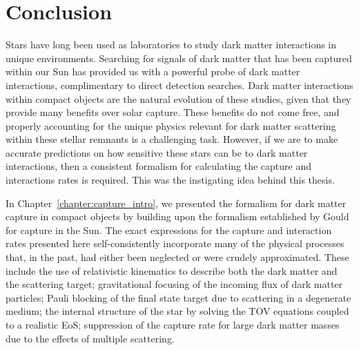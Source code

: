 
\chapter{Conclusion}
\label{chapter:conclusion}

  
Stars have long been used as laboratories to study dark matter interactions in unique environments. Searching for signals of dark matter that has been captured within our Sun has provided us with a powerful probe of dark matter interactions, complimentary to direct detection searches.
Dark matter interactions within compact objects are the natural evolution of these studies, given that they provide many benefits over solar capture. These benefits do not come free, and properly accounting for the unique physics relevant for dark matter scattering within these stellar remnants is a challenging task. However, if we are to make accurate predictions on how sensitive these stars can be to dark matter interactions, then a consistent formalism for calculating the capture and interactions rates is required. This was the instigating idea behind this thesis. 


In Chapter~\ref{chapter:capture_intro}, we presented the formalism for dark matter capture in compact objects by building upon the formalism established by Gould for capture in the Sun. The exact expressions for the capture and interaction rates presented here self-consistently incorporate many of the physical processes that, in the past, had either been neglected or were crudely approximated. These include the use of relativistic kinematics to describe both the dark matter and the scattering target; gravitational focusing of the incoming flux of dark matter particles; Pauli blocking of the final state target due to scattering in a degenerate medium; the internal structure of the star by solving the TOV equations coupled to a realistic EoS; suppression of the capture rate for large dark matter masses due to the effects of multiple scattering. 


